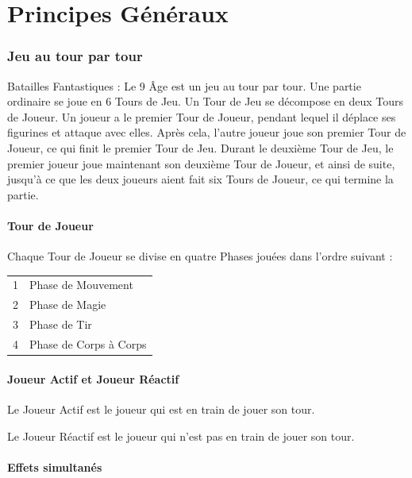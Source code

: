 
\part{Principes Généraux}

\section{Jeu au tour par tour}

Batailles Fantastiques : Le 9\ieme{} Âge est un jeu au tour par tour. Une partie ordinaire se joue en 6 Tours de Jeu. Un Tour de Jeu se décompose en deux Tours de Joueur. Un joueur a le premier Tour de Joueur, pendant lequel il déplace ses figurines et attaque avec elles. Après cela, l'autre joueur joue son premier Tour de Joueur, ce qui finit le premier Tour de Jeu. Durant le deuxième Tour de Jeu, le premier joueur joue maintenant son deuxième Tour de Joueur, et ainsi de suite, jusqu'à ce que les deux joueurs aient fait six Tours de Joueur, ce qui termine la partie.

\subsection{Tour de Joueur}

Chaque Tour de Joueur se divise en quatre Phases jouées dans l'ordre suivant :

\hspace*{0.3cm}
\begin{tabular}{c|l}
1 & Phase de Mouvement \tabularnewline
2 & Phase de Magie \tabularnewline
3 & Phase de Tir \tabularnewline
4 & Phase de Corps à Corps \tabularnewline
\end{tabular}

\subsection{Joueur Actif et Joueur Réactif}

Le Joueur Actif est le joueur qui est en train de jouer son tour.

Le Joueur Réactif est le joueur qui n'est pas en train de jouer son tour.

\subsection{Effets simultanés}

